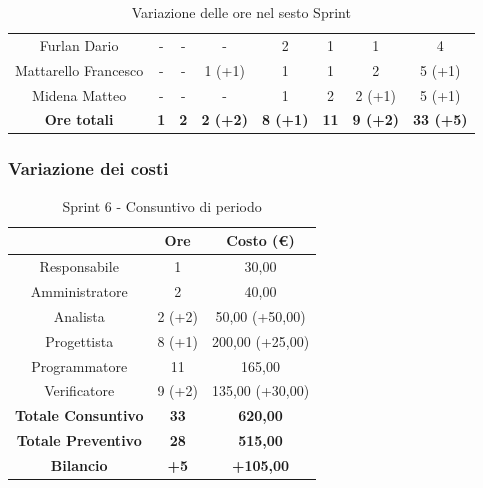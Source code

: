 \begin{table}[H]
\begin{tabular}{c|c|c|c|c|c|c|c}
    Furlan Dario         & -                                                             & -          & -               & 2               & 1           & 1               & 4                \\
    Mattarello Francesco & -                                                             & -          & 1 (+1)          & 1               & 1           & 2               & 5 (+1)           \\
    Midena Matteo        & -                                                             & -          & -               & 1               & 2           & 2 (+1)          & 5 (+1)           \\
    \textbf{Ore totali}  & \textbf{1}                                                    & \textbf{2} & \textbf{2 (+2)} & \textbf{8 (+1)} & \textbf{11} & \textbf{9 (+2)} & \textbf{33 (+5)}
  \end{tabular}
  \caption{Variazione delle ore nel sesto Sprint}
\end{table}

\subsubsection{Variazione dei costi} \label{subsubsection:variazione_costi_sprint6}

\begin{table}[H]
  \centering
  \renewcommand{\arraystretch}{1.8}
  \begin{tabular}{c|c|c}
    \rowcolor[HTML]{125E28}
    \multicolumn{1}{c}{\color[HTML]{FFFFFF}\textbf{Ruolo}} &
    \multicolumn{1}{c}{\color[HTML]{FFFFFF}\textbf{Ore}}   &
    \multicolumn{1}{c}{\color[HTML]{FFFFFF}\textbf{Costo (€)}}                              \\
    \hline
    Responsabile                                           & 1           & 30,00            \\
    Amministratore                                         & 2           & 40,00            \\
    Analista                                               & 2 (+2)      & 50,00 (+50,00)   \\
    Progettista                                            & 8 (+1)      & 200,00 (+25,00)  \\
    Programmatore                                          & 11          & 165,00           \\
    Verificatore                                           & 9 (+2)      & 135,00 (+30,00)  \\
    \textbf{Totale Consuntivo}                             & \textbf{33} & \textbf{620,00}  \\
    \textbf{Totale Preventivo}                             & \textbf{28} & \textbf{515,00}  \\
    \textbf{Bilancio}                                      & \textbf{+5} & \textbf{+105,00} \\
  \end{tabular}
  \caption{Sprint 6 - Consuntivo di periodo}
\end{table}

